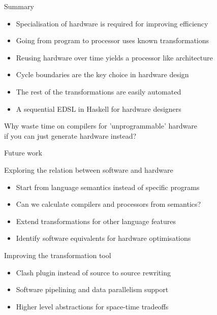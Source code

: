 \documentclass[pdf]{beamer}
\begin{document}
\begin{frame}{Summary}
\begin{block}{}
\begin{itemize}
\item Specialisation of hardware is required for improving efficiency
\item Going from program to processor uses known transformations
\item Reusing hardware over time yields a processor like architecture
\item Cycle boundaries are the key choice in hardware design
\item The rest of the transformations are easily automated
\item A sequential EDSL in Haskell for hardware designers
\end{itemize}
\end{block}
\vspace{2em}
\alert{Why waste time on compilers for 'unprogrammable' hardware \\ if you can just generate hardware instead?}

\end{frame}


\begin{frame}{Future work}

\begin{block}{Exploring the relation between software and hardware}
\begin{itemize}
\item Start from language semantics instead of specific programs
\item Can we calculate compilers and processors from semantics?
\item Extend transformations for other language features %
\item Identify software equivalents for hardware optimisations
\end{itemize}
\end{block}

\begin{block}{Improving the transformation tool}
\begin{itemize}
\item Clash plugin instead of source to source rewriting
\item Software pipelining and data parallelism support
\item Higher level abstractions for space-time tradeoffs
\end{itemize}
\end{block}

\end{frame}
\end{document}
